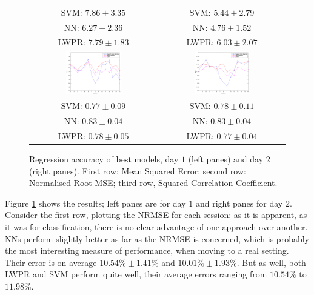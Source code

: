 \begin{figure}[!ht]
\begin{tabular}{cc}
     SVM: $7.86 \pm 3.35$ &  SVM: $5.44 \pm 2.79$ \\
      NN: $6.27 \pm 2.36$ &   NN: $4.76 \pm 1.52$ \\
    LWPR: $7.79 \pm 1.83$ & LWPR: $6.03 \pm 2.07$ \\
    \includegraphics[width=0.45\textwidth]{figs/fig_SCC_regr_resCrossBestOnDay1} &
    \includegraphics[width=0.45\textwidth]{figs/fig_SCC_regr_resCrossBestOnDay2} \\
     SVM: $0.77 \pm 0.09$ &  SVM: $0.78 \pm 0.11$ \\
      NN: $0.83 \pm 0.04$ &   NN: $0.83 \pm 0.04$ \\
    LWPR: $0.78 \pm 0.05$ & LWPR: $0.77 \pm 0.04$ \\
  \end{tabular}
  \caption{Regression accuracy of best models, day $1$ (left panes)
    and day $2$ (right panes). First row: Mean Squared Error; second
    row: Normalised Root MSE; third row, Squared Correlation Coefficient.}
  \label{fig:best_regr}
\end{figure}

Figure \ref{fig:best_regr} shows the results; left panes are for day
$1$ and right panes for day $2$. Consider the first row, plotting the
NRMSE for each session: as it is apparent, as it was for
classification, there is no clear advantage of one approach over
another. NNs perform slightly better as far as the NRMSE is concerned,
which is probably the most interesting measure of performance, when
moving to a real setting. Their error is on average $10.54\% \pm
1.41\%$ and $10.01\% \pm 1.93\%$. But as well, both LWPR and SVM
perform quite well, their average errors ranging from $10.54\%$ to
$11.98\%$.

